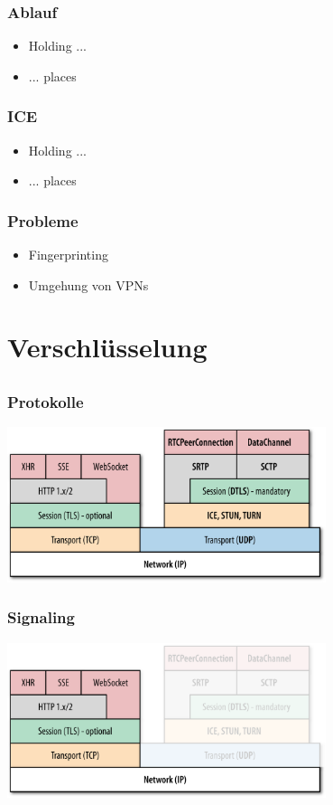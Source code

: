 \documentclass[12pt]{beamer}
\begin{document}
\begin{frame}
  \frametitle{Ablauf}
  \begin{itemize}
    \item Holding ...
    \item ... places
  \end{itemize}
\end{frame}

\begin{frame}
  \frametitle{ICE}
  \begin{itemize}
    \item Holding ...
    \item ... places
  \end{itemize}
\end{frame}

\begin{frame}
  \frametitle{Probleme}
  \begin{itemize}
    \item<2-> Fingerprinting
    \item<3-> Umgehung von VPNs
  \end{itemize}
\end{frame}


\section{Verschlüsselung}
\subsection{} 

\begin{frame}
  \frametitle{Protokolle}
  \centerline{\includegraphics[width=0.7\textwidth]{img/stack_oreilly.png}}
\end{frame}

\begin{frame}
  \frametitle{Signaling}
  \centerline{\includegraphics[width=0.7\textwidth]{img/stack_oreilly_signaling.png}}
\end{frame}
\end{document}
